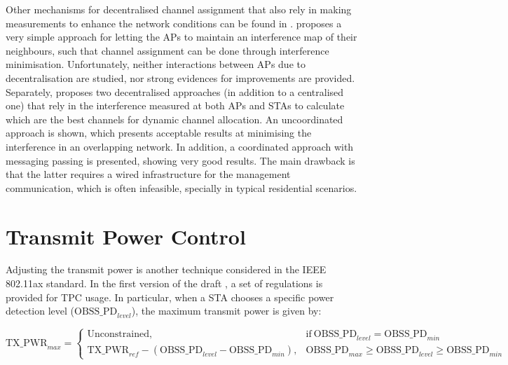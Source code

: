 \documentclass[12pt, a4paper,twoside]{tesi_upf}
\begin{document}
			Other mechanisms for decentralised channel assignment that also rely in making measurements to enhance the network conditions can be found in \cite{akl2007dynamic, chen2007improved}. \cite{akl2007dynamic} proposes a very simple approach for letting the APs to maintain an interference map of their neighbours, such that channel assignment can be done through interference minimisation. Unfortunately, neither interactions between APs due to decentralisation are studied, nor strong evidences for improvements are provided. Separately, \cite{chen2007improved} proposes two decentralised approaches (in addition to a centralised one) that rely in the interference measured at both APs and STAs to calculate which are the best channels for dynamic channel allocation. An uncoordinated approach is shown, which presents acceptable results at minimising the interference in an overlapping network. In addition, a coordinated approach with messaging passing is presented, showing very good results. The main drawback is that the latter requires a wired infrastructure for the management communication, which is often infeasible, specially in typical residential scenarios. 				
			
			\section{Transmit Power Control}
			\label{section:tpc}
				Adjusting the transmit power is another technique considered in the IEEE 802.11ax standard. In the first version of the draft \cite{tgax2016draft}, a set of regulations is provided for TPC usage. In particular, when a STA chooses a specific power detection level ($\text{OBSS\_PD}_{level}$), the maximum transmit power is given by:						
				\begin{scriptsize}
					\begin{equation}
					\text{TX\_PWR}_{max}=
					\begin{cases}
					\text{Unconstrained}, & \text{if}\ \text{OBSS\_PD}_{level} = \text{OBSS\_PD}_{min} \\
					\text{TX\_PWR}_{ref}-(\text{OBSS\_PD}_{level}-\text{OBSS\_PD}_{min}), & \text{OBSS\_PD}_{max} \geq \text{OBSS\_PD}_{level} \geq \text{OBSS\_PD}_{min}
					\end{cases}
					\nonumber
					\end{equation}				
				\end{scriptsize}
				
\end{document}
